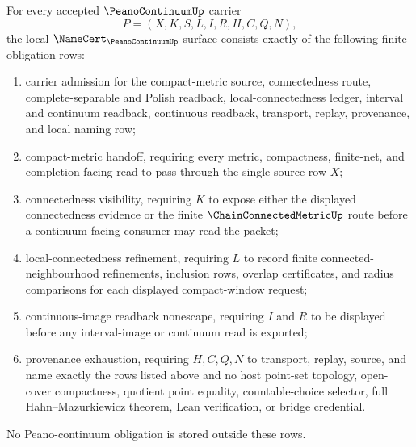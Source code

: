 \begin{theorem}
\label{thm:peano-continuum-namecert-obligations}
For every accepted $\PeanoContinuumUp$ carrier
$$
P=(X,K,S,L,I,R,H,C,Q,N),
$$
the local $\NameCert_{\PeanoContinuumUp}$ surface consists exactly of the following finite obligation rows:
\begin{enumerate}
\item carrier admission for the compact-metric source, connectedness route, complete-separable and Polish readback, local-connectedness ledger, interval and continuum readback, continuous readback, transport, replay, provenance, and local naming row;
\item compact-metric handoff, requiring every metric, compactness, finite-net, and completion-facing read to pass through the single source row $X$;
\item connectedness visibility, requiring $K$ to expose either the displayed connectedness evidence or the finite $\ChainConnectedMetricUp$ route before a continuum-facing consumer may read the packet;
\item local-connectedness refinement, requiring $L$ to record finite connected-neighbourhood refinements, inclusion rows, overlap certificates, and radius comparisons for each displayed compact-window request;
\item continuous-image readback nonescape, requiring $I$ and $R$ to be displayed before any interval-image or continuum read is exported;
\item provenance exhaustion, requiring $H,C,Q,N$ to transport, replay, source, and name exactly the rows listed above and no host point-set topology, open-cover compactness, quotient point equality, countable-choice selector, full Hahn--Mazurkiewicz theorem, Lean verification, or bridge credential.
\end{enumerate}
No Peano-continuum obligation is stored outside these rows.
\end{theorem}

